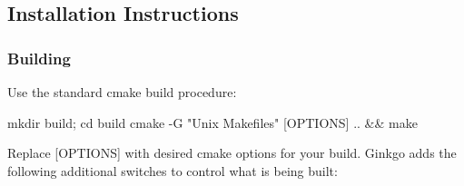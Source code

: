 \subsection*{Installation Instructions }

\subsubsection*{Building}

Use the standard cmake build procedure\+:


\begin{DoxyCode}
mkdir build; cd build
cmake -G "Unix Makefiles" [OPTIONS] .. && make
\end{DoxyCode}
 Replace {\ttfamily \mbox{[}O\+P\+T\+I\+O\+NS\mbox{]}} with desired cmake options for your build. Ginkgo adds the following additional switches to control what is being built\+:


